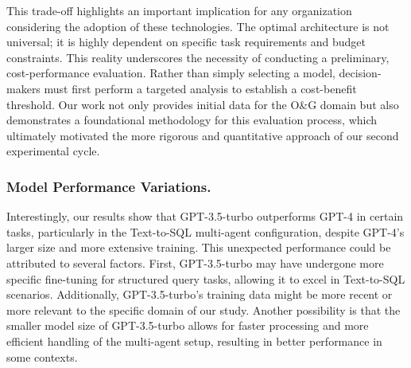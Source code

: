                 This trade-off highlights an important implication for any organization considering the adoption of these technologies. The optimal architecture is not universal; it is highly dependent on specific task requirements and budget constraints. 
                This reality underscores the necessity of conducting a preliminary, cost-performance evaluation. Rather than simply selecting a model, decision-makers must first perform a targeted analysis to establish a cost-benefit threshold. 
                Our work not only provides initial data for the O\&G domain but also demonstrates a foundational methodology for this evaluation process, which ultimately motivated the more rigorous and quantitative approach of our second experimental cycle.


            \subsubsection{Model Performance Variations.}
                Interestingly, our results show that GPT-3.5-turbo outperforms GPT-4 in certain tasks, particularly in the Text-to-SQL multi-agent configuration, despite GPT-4's larger size and more extensive training. 
                This unexpected performance could be attributed to several factors. 
                First, GPT-3.5-turbo may have undergone more specific fine-tuning for structured query tasks, allowing it to excel in Text-to-SQL scenarios. 
                Additionally, GPT-3.5-turbo's training data might be more recent or more relevant to the specific domain of our study. 
                Another possibility is that the smaller model size of GPT-3.5-turbo allows for faster processing and more efficient handling of the multi-agent setup, resulting in better performance in some contexts.

